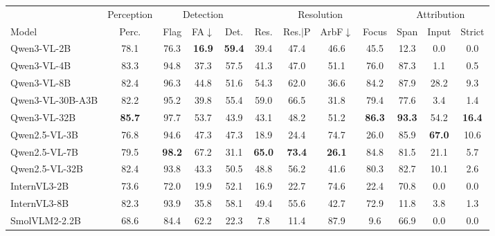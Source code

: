 \begin{tabular}{lccccccccccc}
\toprule
 & \multicolumn{1}{c}{Perception} & \multicolumn{3}{c}{Detection} & \multicolumn{4}{c}{Resolution} & \multicolumn{3}{c}{Attribution} \\
\cmidrule(lr){2-2}\cmidrule(lr){3-5}\cmidrule(lr){6-9}\cmidrule(lr){10-12}
Model & Perc. & Flag & FA$\downarrow$ & Det. & Res. & Res.$|$P & ArbF$\downarrow$ & Focus & Span & Input & Strict \\
\midrule
Qwen3-VL-2B & 78.1 & 76.3 & \textbf{16.9} & \textbf{59.4} & 39.4 & 47.4 & 46.6 & 45.5 & 12.3 & 0.0 & 0.0 \\
Qwen3-VL-4B & 83.3 & 94.8 & 37.3 & 57.5 & 41.3 & 47.0 & 51.1 & 76.0 & 87.3 & 1.1 & 0.5 \\
Qwen3-VL-8B & 82.4 & 96.3 & 44.8 & 51.6 & 54.3 & 62.0 & 36.6 & 84.2 & 87.9 & 28.2 & 9.3 \\
Qwen3-VL-30B-A3B & 82.2 & 95.2 & 39.8 & 55.4 & 59.0 & 66.5 & 31.8 & 79.4 & 77.6 & 3.4 & 1.4 \\
Qwen3-VL-32B & \textbf{85.7} & 97.7 & 53.7 & 43.9 & 43.1 & 48.2 & 51.2 & \textbf{86.3} & \textbf{93.3} & 54.2 & \textbf{16.4} \\
\midrule
Qwen2.5-VL-3B & 76.8 & 94.6 & 47.3 & 47.3 & 18.9 & 24.4 & 74.7 & 26.0 & 85.9 & \textbf{67.0} & 10.6 \\
Qwen2.5-VL-7B & 79.5 & \textbf{98.2} & 67.2 & 31.1 & \textbf{65.0} & \textbf{73.4} & \textbf{26.1} & 84.8 & 81.5 & 21.1 & 5.7 \\
Qwen2.5-VL-32B & 82.4 & 93.8 & 43.3 & 50.5 & 48.8 & 56.2 & 41.6 & 80.3 & 82.7 & 10.1 & 2.6 \\
\midrule
InternVL3-2B & 73.6 & 72.0 & 19.9 & 52.1 & 16.9 & 22.7 & 74.6 & 22.4 & 70.8 & 0.0 & 0.0 \\
InternVL3-8B & 82.3 & 93.9 & 35.8 & 58.1 & 49.4 & 55.6 & 42.7 & 72.9 & 11.8 & 3.8 & 1.3 \\
\midrule
SmolVLM2-2.2B & 68.6 & 84.4 & 62.2 & 22.3 & 7.8 & 11.4 & 87.9 & 9.6 & 66.9 & 0.0 & 0.0 \\
\bottomrule
\end{tabular}
